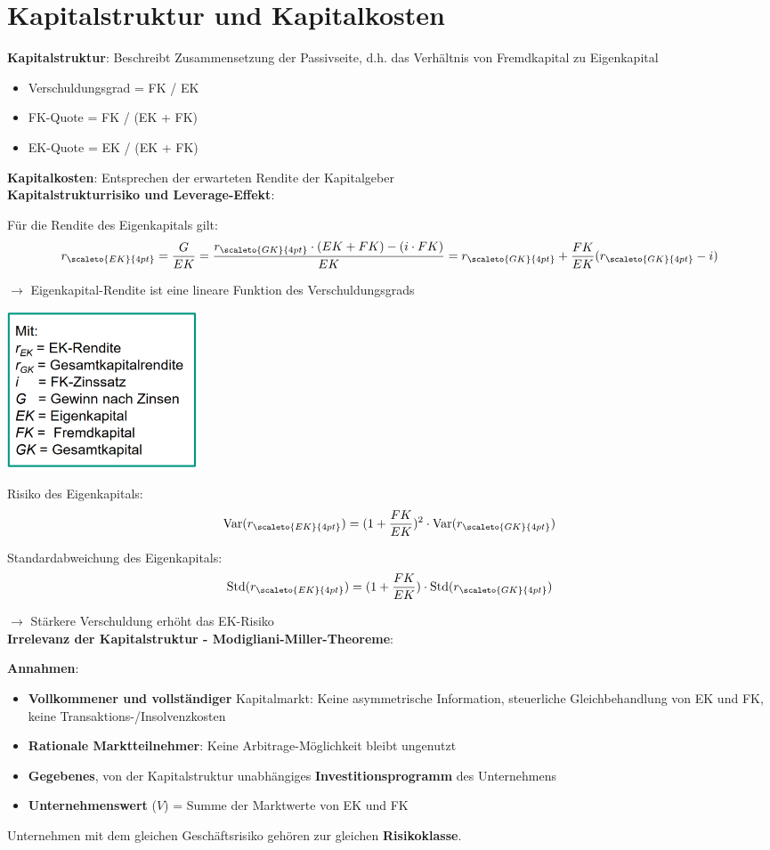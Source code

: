 \section{Kapitalstruktur und Kapitalkosten}

\textbf{Kapitalstruktur}: Beschreibt Zusammensetzung der Passivseite, d.h. das Verhältnis von Fremdkapital zu Eigenkapital
\begin{itemize}
	\item Verschuldungsgrad = FK / EK
	\item FK-Quote = FK / (EK + FK)
	\item EK-Quote = EK / (EK + FK)
\end{itemize}

\textbf{Kapitalkosten}: Entsprechen der erwarteten Rendite der Kapitalgeber\\

\textbf{Kapitalstrukturrisiko und Leverage-Effekt}:

Für die Rendite des Eigenkapitals gilt:
$$r_{\scaleto{EK}{4pt}}=\frac{G}{EK}=\frac{r_{\scaleto{GK}{4pt}}\cdot (EK+FK)-(i\cdot FK)}{EK}=r_{\scaleto{GK}{4pt}}+\frac{FK}{EK}(r_{\scaleto{GK}{4pt}}-i)$$

$\rightarrow$ Eigenkapital-Rendite ist eine lineare Funktion des Verschuldungsgrads
\begin{center}
	\includegraphics[width=0.25\textwidth]{images/ekr.png}
\end{center}

Risiko des Eigenkapitals:
$$\text{Var}(r_{\scaleto{EK}{4pt}})=(1+\frac{FK}{EK})^2\cdot\text{Var}(r_{\scaleto{GK}{4pt}})$$

Standardabweichung des Eigenkapitals:
$$\text{Std}(r_{\scaleto{EK}{4pt}})=(1+\frac{FK}{EK})\cdot\text{Std}(r_{\scaleto{GK}{4pt}})$$

$\rightarrow$ Stärkere Verschuldung erhöht das EK-Risiko\\

\textbf{Irrelevanz der Kapitalstruktur - Modigliani-Miller-Theoreme}:

\textbf{Annahmen}:
\begin{itemize}
	\item \textbf{Vollkommener und vollständiger} Kapitalmarkt: Keine asymmetrische Information, steuerliche Gleichbehandlung von EK und FK, keine Transaktions-/Insolvenzkosten
	\item \textbf{Rationale Marktteilnehmer}: Keine Arbitrage-Möglichkeit bleibt ungenutzt
	\item \textbf{Gegebenes}, von der Kapitalstruktur unabhängiges \textbf{Investitionsprogramm} des
	Unternehmens
	\item \textbf{Unternehmenswert} ($V$) = Summe der Marktwerte von EK und FK
\end{itemize}
Unternehmen mit dem gleichen Geschäftsrisiko gehören zur gleichen \textbf{Risikoklasse}.

